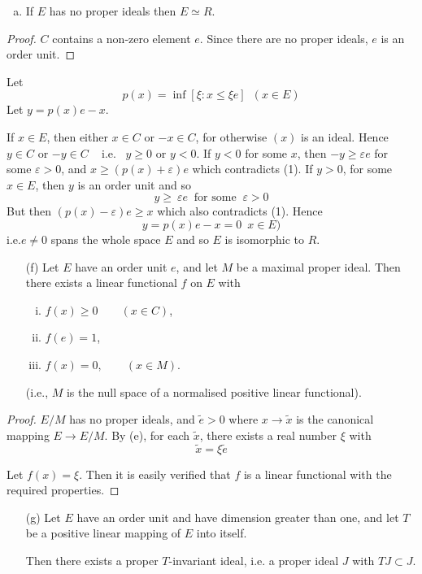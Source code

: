 \begin{enumerate}[(e)]
 \item If $E$ has no proper ideals then $E \simeq R$.
 \end{enumerate}
 
\begin{proof}
  $C$ contains a non-zero element $e$. Since there are no proper
  ideals, $e$ is an  order unit. 
\end{proof} 

Let 
\begin{equation*}
  p (x) = \inf [ \xi : x \leq \xi e ] ~ \; (x \in E) \tag{1}
\end{equation*}
Let \qquad $y = p (x)e - x $.

If $x \in E$, then either $x \in C$ or $-x \in C$, for otherwise $(x)$
is an ideal. Hence $y \in C$ or $-y \in C$ ~ i.e. ~$y \ge 0$ or $y <
0$. If $y < 0$ for some $x$, then $-y \ge \varepsilon e$ for some
$\varepsilon > 0$, and  $x \ge (p (x) + \varepsilon)e$ which contradicts
(1). If $y > 0$, for some $x \in E$, then $y$ is an order unit and so   
$$
y \ge ~ \varepsilon e ~ \text{ for some } ~ \varepsilon > 0
$$
But then $(p (x) - \varepsilon) e \ge x$ which also contradicts
(1). Hence  
$$
y = p (x)e - x = 0 ~ \; x \in E)
$$
i.e.\pageoriginale $e \neq 0$ spans the whole space $E$ and so $E$ is
isomorphic to $R$.  
\begin{enumerate}
\item[(f)] Let $E$ have an order unit $e$, and let $M$ be a maximal
  proper ideal. Then there exists a linear functional $f$ on $E$ with  
  \begin{enumerate}[(i)]
  \item $f(x) \geq 0 \qquad (x \in C)$,

  \item $f(e) = 1$,

  \item $f(x) = 0, \qquad (x \in M)$.
  \end{enumerate}
  (i.e., $M$ is the null space of a normalised positive linear functional).
\end{enumerate}

\begin{proof}
  $E/M$ has no proper ideals, and $\tilde{e} > 0$ where $x \to
  \tilde{x}$ is the canonical mapping $E \to E/M$. By (e), for
  each $\tilde{x}$,  there exists a real number $\xi$ with  
  $$
  \tilde{x} = \xi \tilde{e}
  $$
  
  Let $f(x)= \xi$. Then it is easily verified that $f$ is a linear
  functional with the required properties. 
\end{proof}
\begin{enumerate}
\item[(g)] Let $E$ have an order unit and have dimension greater than
  one, and let $T$ be a positive linear mapping of $E$ into itself. 

  Then there exists a proper $T$-invariant ideal, i.e. a proper ideal
  $J$ with $T J \subset J$. 
\end{enumerate}

